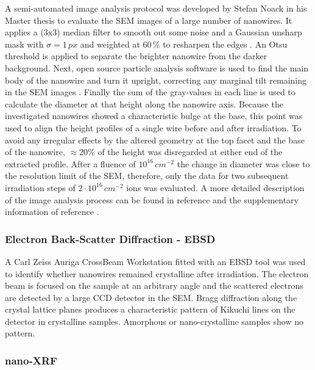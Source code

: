 A semi-automated image analysis protocol was developed by Stefan Noack in his Master thesis \cite{noack_sputter_2014, johannes_anomalous_2015} to evaluate the SEM images of a large number of nanowires. It applies a (3x3) median filter to smooth out some noise and a Gaussian unsharp mask with $\sigma = 1\,px$ and weighted at $60\,\%$ to resharpen the edges \cite{sankur_survey_2004}. An Otsu threshold \cite{otsu_threshold_1979} is applied to separate the brighter nanowire from the darker background. Next, open source particle analysis software is used to find the main body of the nanowire and turn it upright, correcting any marginal tilt remaining in the SEM images \cite{schindelin_fiji:_2012,sage_imagej_2012}. Finally the sum of the gray-values in each line is used to calculate the diameter at that height along the nanowire axis. Because the investigated nanowires showed a characteristic bulge at the base, this point was used to align the height profiles of a single wire before and after irradiation. To avoid any irregular effects by the altered geometry at the top facet and the base of the nanowire, $\approx 20\%$ of the height was disregarded at either end of the extracted profile. After a fluence of $10^{16}\,cm^{-2}$ the change in diameter was close to the resolution limit of the SEM, therefore, only the data for two subsequent irradiation steps of $2\cdot 10^{16}\,cm^{-2}$ ions was evaluated. A more detailed description of the image analysis process can be found in reference \cite{noack_sputter_2014} and the supplementary information of reference \cite{johannes_anomalous_2015}.

\subsubsection{Electron Back-Scatter Diffraction - EBSD}

A Carl Zeiss Auriga CrossBeam Workstation fitted with an EBSD tool was used to identify whether nanowires remained crystalline after irradiation. The electron beam is focused on the sample at an arbitrary angle and the scattered electrons are detected by a large CCD detector in the SEM. Bragg diffraction along the crystal lattice planes produces a characteristic pattern of Kikuchi lines on the detector \cite{kikuchi_diffraction_1928,fultz_transmission_2013} in crystalline samples. Amorphous or nano-crystalline samples show no pattern.

\subsubsection{nano-XRF}


